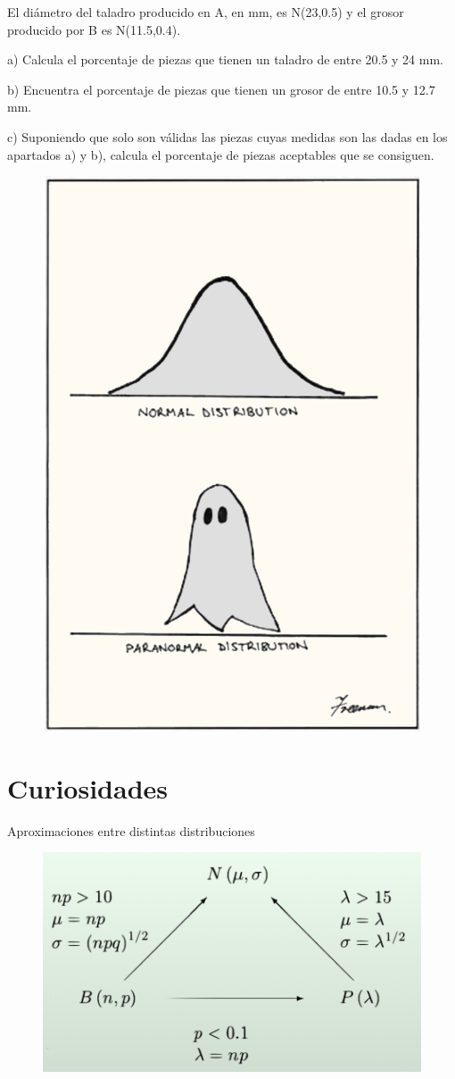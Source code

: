 \begin{adjustwidth}{20pt}{10pt}
\begin{enumerate}[PB. 1. ]
		El diámetro del taladro producido en A, en mm, es N(23,0.5) y el grosor producido por B es N(11.5,0.4).
		
		a) Calcula el porcentaje de piezas que tienen un taladro de entre 20.5 y 24 mm.
		
		b) Encuentra el porcentaje de piezas que tienen un grosor de entre 10.5 y 12.7 mm.
		
		c) Suponiendo que solo son válidas las piezas cuyas medidas son las dadas en los apartados a) y b), calcula el porcentaje de piezas aceptables que se consiguen.
		
		\hspace{-1cm}\vspace{1cm}
		\end{enumerate}
	\end{adjustwidth}
	
	\begin{figure}[H]
	\centering
	\includegraphics[width=.35\textwidth]{imagenes/imagenes04/T04IM33.png}
	\end{figure}

\newpage
\section{Curiosidades}

	
\begin{myexampleblock}{Aproximaciones entre distintas distribuciones}	
	\begin{figure}[H]
	\centering
	\includegraphics[width=.6\textwidth]{imagenes/imagenes04/T04IM38.png}
	\end{figure}	
\end{myexampleblock}


